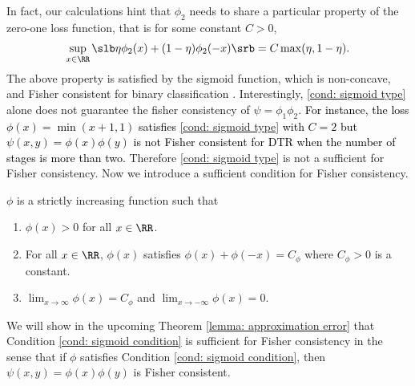 \documentclass[preprint] {imsart}
\begin{document}
   In fact, our calculations hint that
 $\phi_2$ needs to share  a particular property of the zero-one loss function, that is for some constant $C > 0$, 
 \begin{align}
     \label{cond: sigmoid type}
    \sup_{x\in\RR}\slb \eta\phi_2(x)+(1-\eta)\phi_2(-x)\srb=C\max(\eta,1-\eta) .%
 \end{align}
  The above property is satisfied by the sigmoid function, which is non-concave, and Fisher consistent for binary classification \citep{bartlett2006}.  
  Interestingly, \eqref{cond: sigmoid type} alone does not guarantee the fisher consistency of $\psi=\phi_1\phi_2$. \textcolor{black}{For instance, the  loss $\phi(x)=\min(x+1,1)$ satisfies \eqref{cond: sigmoid type} with $C=2$ \citep[cf.][]{bartlett2006} but $\psi(x,y)=\phi(x)\phi(y)$ is not Fisher consistent for DTR when the number of stages is more than two.  } Therefore \eqref{cond: sigmoid type} is not a sufficient for Fisher consistency.
  Now we introduce a sufficient condition for Fisher consistency.  
  \begin{condition}\label{cond: sigmoid  condition}
$\phi$ is a strictly increasing function such that
\begin{enumerate}
    \item $\phi(x)>0$ for all $x\in\RR$.
    \item  For all $x\in\RR$, $\phi(x)$ satisfies $\phi(x)+\phi(-x)=C_\phi$ where $C_\phi>0$ is a constant.
    \item $\lim_{x\to\infty}\phi(x)=C_\phi$ and  $\lim_{x\to-\infty}\phi(x)=0$.
\end{enumerate}
 \end{condition}
 We will show in the upcoming Theorem \ref{lemma: approximation error} that Condition \ref{cond: sigmoid  condition} is sufficient for Fisher consistency in the sense that if $\phi$ satisfies Condition \ref{cond: sigmoid  condition}, then $\psi(x,y)=\phi(x)\phi(y)$ is Fisher consistent. 
\end{document}
